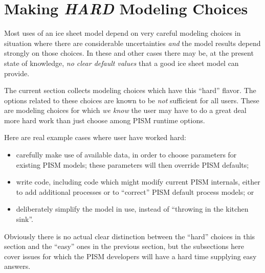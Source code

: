 
\section{Making \emph{HARD} Modeling Choices}
\label{sec:hard-choices}

Most uses of an ice sheet model depend on very careful modeling choices in situation where there are considerable uncertainties \emph{and} the model results depend strongly on those choices.  In these and other cases there may be, at the present state of knowledge, \emph{no clear default values} that a good ice sheet model can provide.

The current section collects modeling choices which have this ``hard'' flavor.  The options related to these choices are known to be \emph{not} sufficient for all users.  These are modeling choices for which \emph{we know} the user may have to do a great deal more hard work than just choose among PISM runtime options.

Here are real example cases where user have worked hard:
\begin{itemize}
\item carefully make use of available data, in order to choose parameters for existing PISM models; these parameters will then override PISM defaults; 
\begin{center} %
\end{center}
\item write code, including code which might modify current PISM internals, either to add additional processes or to ``correct'' PISM default process models; or 
\begin{center} %
\end{center}
\item deliberately simplify the model in use, instead of ``throwing in the kitchen sink''.
\begin{center} %
\end{center}
\end{itemize}
Obviously there is no actual clear distinction between the ``hard'' choices in this section and the ``easy'' ones in the previous section, but the subsections here cover issues for which the PISM developers will have a hard time supplying easy answers.

